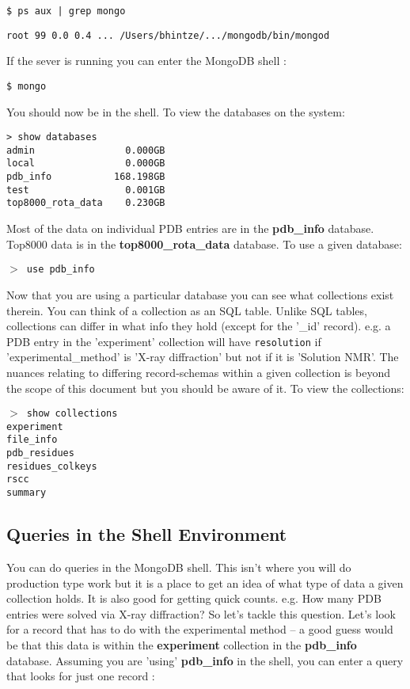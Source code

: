 \documentclass[12pt]{article}
\newcommand{\cmdline}[1]{\vspace{5mm} \noindent
\texttt{\$ #1}
\vspace{5mm}

}
\newcommand{\mdbcmdline}[1]{\vspace{5mm} \noindent
\texttt{$>$ #1}
\vspace{5mm}

}
\newcommand{\mdbdb}[1]{{\color{BlueViolet}\textbf{#1}}}
\newcommand{\mdbcol}[1]{{\color{Bittersweet}\textbf{#1}}}
\begin{document}
\cmdline{ps aux | grep mongo}
\noindent
\texttt{root 99 0.0 0.4 ... /Users/bhintze/.../mongodb/bin/mongod}

\vspace{5mm}
\noindent
If the sever is running you can enter the MongoDB shell :

\cmdline{mongo}
\noindent
You should now be in the shell.
To view the databases on the system:

\begin{verbatim}
> show databases
admin                0.000GB
local                0.000GB
pdb_info           168.198GB
test                 0.001GB
top8000_rota_data    0.230GB
\end{verbatim}

\noindent
Most of the data on individual PDB entries are in the \mdbdb{pdb\_info} database.
Top8000 data is in the \mdbdb{top8000\_rota\_data} database.
\noindent
To use a given database:

\mdbcmdline{use pdb\_info}
\noindent
Now that you are using a particular database you can see what collections exist therein. 
You can think of a collection as an SQL table.
Unlike SQL tables, collections can differ in what info they hold (except for the '\_id' record).
e.g. a PDB entry in the 'experiment' collection will have \texttt{resolution} if 'experimental\_method' is 'X-ray diffraction' but not if it is 'Solution NMR'.
The nuances relating to differing record-schemas within a given collection is beyond the scope of this document but you should be aware of it. To view the collections:

\mdbcmdline{show collections\\
experiment\\
file\_info\\
pdb\_residues\\
residues\_colkeys\\
rscc\\
summary}

\subsection{Queries in the Shell Environment}
You can do queries in the MongoDB shell. 
This isn't where you will do production type work but it is a place to get an idea of what type of data a given collection holds.
It is also good for getting quick counts.
e.g. How many PDB entries were solved via X-ray diffraction?
So let's tackle this question.
Let's look for a record that has to do with the experimental method -- a good guess would be that this data is within the \mdbcol{experiment} collection in the \mdbdb{pdb\_info} database.
Assuming you are 'using' \mdbdb{pdb\_info} in the shell, you can enter a query that looks for just one record :
\end{document}
